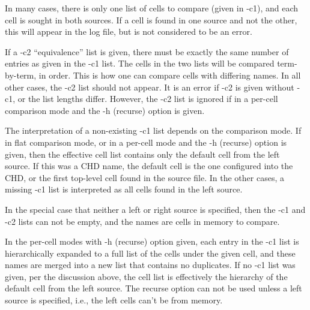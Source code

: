 In many cases, there is only one list of cells to compare (given in
{\vt -c1}), and each cell is sought in both sources.  If a cell is
found in one source and not the other, this will appear in the log
file, but is not considered to be an error.

If a {\vt -c2} ``equivalence'' list is given, there must be exactly
the same number of entries as given in the {\vt -c1} list.  The cells
in the two lists will be compared term-by-term, in order.  This is how
one can compare cells with differing names.  In all other cases, the
{\vt -c2} list should not appear.  It is an error if {\vt -c2} is
given without {\vt -c1}, or the list lengths differ.  However, the
{\vt -c2} list is ignored if in a per-cell comparison mode and the
{\vt -h} (recurse) option is given.

The interpretation of a non-existing {\vt -c1} list depends on the
comparison mode.  If in flat comparison mode, or in a per-cell mode
and the {\vt -h} (recurse) option is given, then the effective cell
list contains only the default cell from the left source.  If this was
a CHD name, the default cell is the one configured into the CHD, or
the first top-level cell found in the source file.  In the other
cases, a missing {\vt -c1} list is interpreted as all cells found in
the left source.

In the special case that neither a left or right source is specified,
then the {\vt -c1} and {\vt -c2} lists can not be empty, and the names
are cells in memory to compare.

In the per-cell modes with {\vt -h} (recurse) option given, each entry
in the {\vt -c1} list is hierarchically expanded to a full list of the
cells under the given cell, and these names are merged into a new list
that contains no duplicates.  If no {\vt -c1} list was given, per the
discussion above, the cell list is effectively the hierarchy of the
default cell from the left source.  The recurse option can not be used
unless a left source is specified, i.e., the left cells can't be from
memory.

